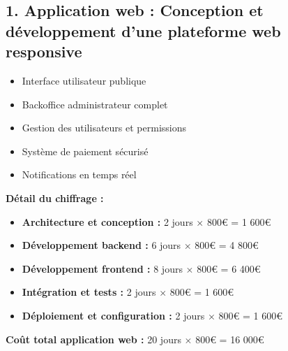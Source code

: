 \documentclass{report}
\begin{document}
\subsection*{1. Application web : Conception et développement d'une plateforme web responsive}
\vspace{0.2cm}
\begin{itemize}
    \item Interface utilisateur publique
    \item Backoffice administrateur complet
    \item Gestion des utilisateurs et permissions
    \item Système de paiement sécurisé
    \item Notifications en temps réel
\end{itemize}
\noindent \textbf{Détail du chiffrage :}
\begin{itemize}
    \item \textbf{Architecture et conception :} 2 jours $\times$ 800€ = 1 600€
    \item \textbf{Développement backend :} 6 jours $\times$ 800€ = 4 800€
    \item \textbf{Développement frontend :} 8 jours $\times$ 800€ = 6 400€
    \item \textbf{Intégration et tests :} 2 jours $\times$ 800€ = 1 600€
    \item \textbf{Déploiement et configuration :} 2 jours $\times$ 800€ = 1 600€
\end{itemize}
\vspace{0.2cm}
\noindent \textbf{Coût total application web :} 20 jours $\times$ 800€ = 16 000€
\vspace{0.5cm}
\end{document}
